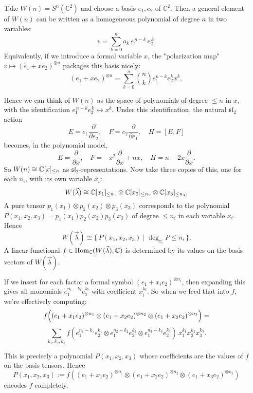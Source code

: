 \documentclass[12pt]{article}
\begin{document}
\begin{remark}
     Take $W(n) = S^n(\mathbb{C}^2)$ and choose a basis $e_1, e_2$ of $\mathbb{C}^2$. Then a general element of $W(n)$ can be written as a homogeneous polynomial of degree $n$ in two variables:
    \[v = \sum_{k=0}^{n} a_k\, e_1^{\,n-k}\, e_2^{\,k}.\]
    Equivalently, if we introduce a formal variable $x$, the "polarization map" $v \mapsto (e_1 + x e_2)^{\otimes n}$ packages this basis nicely:
    \[(e_1 + x e_2)^{\otimes n} = \sum_{k=0}^{n} \binom{n}{k} e_1^{n-k} e_2^k x^k,\]

    Hence we can think of $W(n)$ as the space of polynomials of degree $\leq n$ in $x$, with the identification $e_1^{\,n-k} e_2^{\,k} \leftrightarrow x^k$. Under this identification, the natural $\mathfrak{sl}_2$ action
    \[E = e_1\frac{\partial}{\partial e_2}, \quad F = e_2\frac{\partial}{\partial e_1}, \quad H = [E,F]\]
    becomes, in the polynomial model,
    \[E = \frac{\partial}{\partial x}, \quad F = -x^2\frac{\partial}{\partial x} + n x, \quad H = n - 2x\frac{\partial}{\partial x}.\]
    So $W(n)\cong \mathbb{C}[x]_{\leq n}$ as $\mathfrak{sl}_2$-representations. Now take three copies of this, one for each $n_i$, with its own variable $x_i$:
    \[W(\vec\lambda) \cong \mathbb{C}[x_1]_{\leq n_1}\otimes \mathbb{C}[x_2]_{\leq n_2}\otimes \mathbb{C}[x_3]_{\leq n_3}.\]
    A pure tensor $p_1(x_1)\otimes p_2(x_2)\otimes p_3(x_3)$ corresponds to the polynomial $P(x_1,x_2,x_3) = p_1(x_1)p_2(x_2)p_3(x_3)$ of degree $\leq n_i$ in each variable $x_i$. Hence
    \[W(\vec\lambda) \cong \{\,P(x_1,x_2,x_3)\mid \deg_{x_i}P\le n_i\,\}.\]
    A linear functional $f \in \operatorname{Hom}_{\mathbb{C}}(W(\vec\lambda), \mathbb{C})$ is determined by its values on the basis vectors of $W(\vec\lambda)$. 

    If we insert for each factor a formal symbol $(e_1 + x_i e_2)^{\otimes n_i}$, then expanding this gives all monomials $e_1^{n_i-k_i}e_2^{k_i}$ with coefficient $x_i^{k_i}$. So when we feed that into $f$, we're effectively computing:
    \[f\Bigl((e_1 + x_1 e_2)^{\otimes n_1} \otimes (e_1 + x_2 e_2)^{\otimes n_2} \otimes (e_1 + x_3 e_2)^{\otimes n_3}\Bigr) = \]
    \[\sum_{k_1,k_2,k_3} f(e_1^{n_1-k_1}e_2^{k_1}\otimes e_1^{n_2-k_2}e_2^{k_2}\otimes e_1^{n_3-k_3}e_2^{k_3}) \,x_1^{k_1}x_2^{k_2}x_3^{k_3}.\]

    This is precisely a polynomial $P(x_1,x_2,x_3)$ whose coefficients are the values of $f$ on the basis tensors. Hence
    \[P(x_1,x_2,x_3) := f\!\left((e_1+x_1e_2)^{\otimes n_1} \otimes (e_1+x_2e_2)^{\otimes n_2} \otimes (e_1+x_3e_2)^{\otimes n_3}\right)\]
    encodes $f$ completely.


\end{remark}
\end{document}
